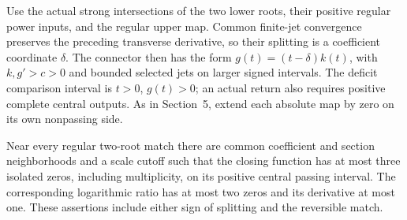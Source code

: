 Use the actual strong intersections of the two lower roots, their
positive regular power inputs, and the regular upper map. Common
finite-jet convergence preserves the preceding transverse derivative,
so their splitting is a coefficient coordinate $\delta$. The connector
then has the form $g(t)=(t-\delta)k(t)$, with $k,g'>c>0$ and
bounded selected jets on larger signed intervals. The deficit comparison
interval is $t>0$, $g(t)>0$; an actual return also requires positive
complete central outputs. As in Section~5, extend each absolute map by
zero on its own nonpassing side.

\begin{proposition}
\label{rw:finite:two-root-count}
Near every regular two-root match there are common coefficient
and section neighborhoods and a scale cutoff such that the closing
function has at most three isolated zeros, including multiplicity,
on its positive central passing interval. The corresponding
logarithmic ratio has at most two zeros and its derivative at most
one. These assertions include either sign of splitting and the
reversible match.
\end{proposition}
